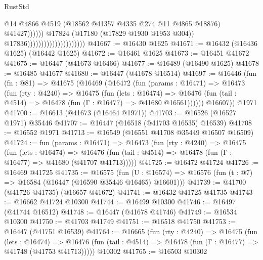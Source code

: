 \begin{lexlean}{RustStd}
\begin{coremodule}
                                                          @14
                                                          @4866
                                                          @4519
                                                          (@18562
                                                            @41357
                                                            @4335
                                                            @274
                                                            @11
                                                            @4865
                                                            @18876)
                                                          @41427))))))
                                              @17824
                                              (@17180 (@17829 @1930 @1953 @304))
                                              @17836)))))))))))))))))))))
@41667 := @16430 @1625
@41671 := @16432 (@16436 @1625) (@16442 @1625)
@41672 := @16461 @1625
@41673 := @16451 @41672
@41675 := @16447 (@41673 @16466)
@41677 := @16489 (@16490 @1625)
@41678 := @16485 @41677
@41680 := @16447 (@41678 @16514)
@41697 := @16446
    (fun (fn : @81) =>
    @41675
      (@16469
        (@16472
          (fun (params : @16471) =>
          @16473
            (fun (rty : @4240) =>
            @16475
              (fun (lets : @16474) =>
              @16476 (fun (tail : @4514) => @16478 (fun (Γ : @16477) => @41680 @16561))))))
        @16607))
    @1971
@41700 := @16613 (@41673 (@16464 @1971))
@41703 := @16526 (@16527 @1971) @35446
@41707 := @16447 (@16518 (@41703 @16535) @16539)
@41708 := @16552 @1971
@41713 := @16549 (@16551 @41708 @35449 @16507 @16509)
@41724 := fun (params : @16471) =>
  @16473
    (fun (rty : @4240) =>
    @16475
      (fun (lets : @16474) =>
      @16476 (fun (tail : @4514) => @16478 (fun (Γ : @16477) => @41680 (@41707 @41713)))))
@41725 := @16472 @41724
@41726 := @16469 @41725
@41735 := @16575
    (fun (U : @16574) => @16576 (fun (t : @7) => @16584 (@16447 (@16590 @35446 @16465) @16601)))
@41739 := @41700 (@41726 @41735) (@16657 @41672)
@41741 := @16432 @41725 @41735
@41743 := @16662 @41724 @10300
@41744 := @16499 @10300
@41746 := @16497 (@41744 @16512)
@41748 := @16447 (@41678 @41746)
@41749 := @16534 @10300
@41750 := @41703 @41749
@41751 := @16518 @41750
@41753 := @16447 (@41751 @16539)
@41764 := @16665
    (fun (rty : @4240) =>
    @16475
      (fun (lets : @16474) =>
      @16476 (fun (tail : @4514) => @16478 (fun (Γ : @16477) => @41748 (@41753 @41713)))))
    @10302
@41765 := @16503 @10302

\end{coremodule}
\end{lexlean}
